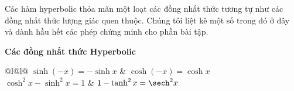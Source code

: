 \begin{minipage}[t]{0.68\textwidth}
  \vspace{4pt}
  Các hàm hyperbolic thỏa mãn một loạt các đồng nhất thức tương tự như các đồng nhất thức lượng giác quen thuộc. Chúng tôi liệt kê một số trong đó ở đây và dành hầu hết các phép chứng minh cho phần bài tập.

  \vspace{8pt}

  \begin{tcolorbox}[
    colback=white,
    colframe=stewartred,
    boxrule=0.85pt,
    arc=0mm,
    left=14pt,
    right=14pt,
    top=8pt,
    bottom=8pt
  ]
    {\textsf{\textbf{\color{stewartred}\large Các đồng nhất thức Hyperbolic}}}\\[8pt]
    \begin{tabular}{@{}l@{\hspace{2.2cm}}l@{}}
      $\sinh(-x) = -\sinh x$ & $\cosh(-x) = \cosh x$ \\[6pt]
      $\cosh^2 x - \sinh^2 x = 1$ & $1 - \tanh^2 x = \sech^2 x$ \\[6pt]
       \\[6pt]
    \end{tabular}
  \end{tcolorbox}
\end{minipage}
